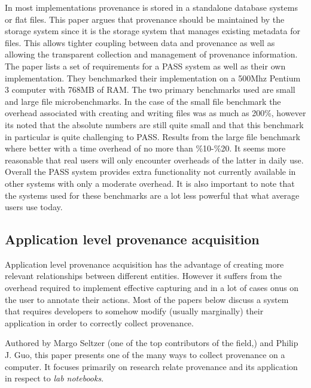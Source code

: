 In most implementations provenance is stored in a standalone database systems or flat files. This paper argues that provenance should be maintained by the storage system since it is the storage system that manages existing metadata for files. This allows tighter coupling between data and provenance as well as allowing the transparent collection and management of provenance information. The paper lists a set of requirements for a PASS system as well as their own implementation. They benchmarked their implementation on a 500Mhz Pentium 3 computer with 768MB of RAM. The two primary benchmarks used are small and large file microbenchmarks. In the case of the small file benchmark the overhead associated with creating and writing files was as much as 200\%, however its noted that the absolute numbers are still quite small and that this benchmark in particular is quite challenging to PASS. Results from the large file benchmark where better with a time overhead of no more than \%10-\%20.  It seems more reasonable that real users will only encounter overheads of the latter in daily use. Overall the PASS system provides extra functionality not currently available in other systems with only a moderate overhead. It is also important to note that the systems used for these benchmarks are a lot less powerful that what average users use today.

\subsection{Application level provenance acquisition}
\label{sub:application_level_provenance_acquisition}

Application level provenance acquisition has the advantage of creating more relevant relationships between different entities. However it suffers from the overhead required to implement effective capturing and in a lot of cases onus on the user to annotate their actions. Most of the papers below discuss a system that requires developers to somehow modify (usually marginally) their application in order to correctly collect provenance.


Authored by Margo Seltzer (one of the top contributors of the field\cite{Macko2012,Seltzer2011,Borkin2013,Muniswamy-Reddy2010,Braun2008},) and Philip J. Guo, this paper presents one of the many ways to collect provenance on a computer. It focuses primarily on research relate provenance and its application in respect to \textit{lab notebooks}.


